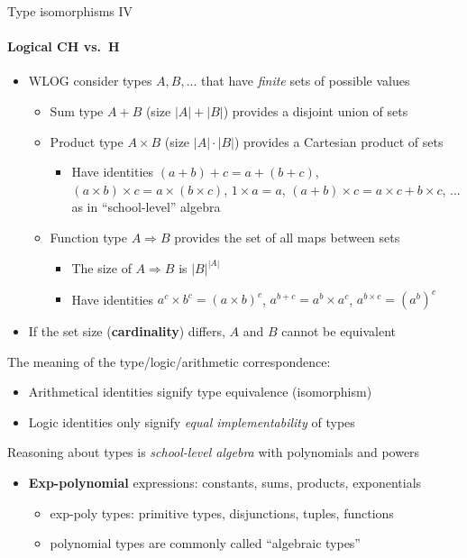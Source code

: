 \documentclass[english]{beamer}
\begin{document}
\begin{frame}{Type isomorphisms IV}


\framesubtitle{Logical CH vs.\ H}
\begin{itemize}
\item WLOG consider types $A,B,...$ that have \emph{finite} sets of possible
values
\begin{itemize}
\item Sum type $A+B$ (size $\left|A\right|+\left|B\right|$) provides a
disjoint union of sets
\item Product type $A\times B$ (size $\left|A\right|\cdot\left|B\right|$)
provides a Cartesian product of sets
\begin{itemize}
\item Have identities $\left(a+b\right)+c=a+\left(b+c\right)$, $\left(a\times b\right)\times c=a\times(b\times c)$,
$1\times a=a$, $\left(a+b\right)\times c=a\times c+b\times c$, ...
\textendash{} as in ``school-level'' algebra
\end{itemize}
\item Function type $A\Rightarrow B$ provides the set of all maps between
sets
\begin{itemize}
\item The size of $A\Rightarrow B$ is $\left|B\right|^{\left|A\right|}$
\item Have identities $a^{c}\times b^{c}=\left(a\times b\right)^{c}$, $a^{b+c}=a^{b}\times a^{c}$,
$a^{b\times c}=\left(a^{b}\right)^{c}$
\end{itemize}
\end{itemize}
\item If the set size (\textbf{cardinality}) differs, $A$ and $B$ cannot
be equivalent 
\end{itemize}
The meaning of the type/logic/arithmetic correspondence:
\begin{itemize}
\item Arithmetical identities signify type equivalence (isomorphism)
\item Logic identities only signify \emph{equal implementability} of types
\end{itemize}
Reasoning about types is \emph{school-level algebra} with polynomials
and powers
\begin{itemize}
\item \textbf{Exp-polynomial }expressions: constants, sums, products, exponentials
\begin{itemize}
\item exp-poly types: primitive types, disjunctions, tuples, functions
\item polynomial types are commonly called ``algebraic types''
\end{itemize}
\end{itemize}
\end{frame}
\end{document}
